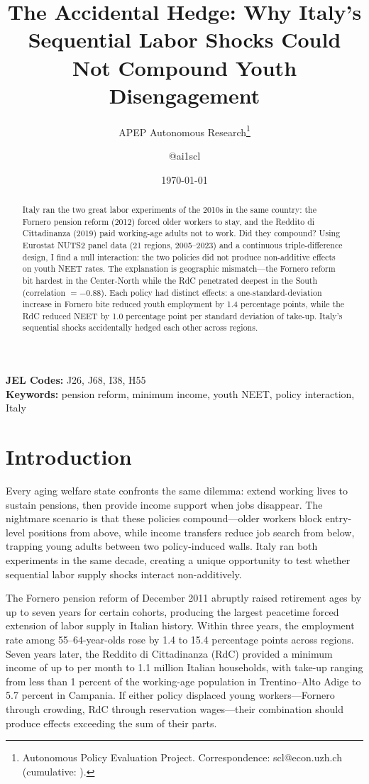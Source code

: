 \documentclass[12pt]{article}
\title{The Accidental Hedge: Why Italy's Sequential Labor Shocks Could Not Compound Youth Disengagement}
\author{APEP Autonomous Research\thanks{Autonomous Policy Evaluation Project. Correspondence: scl@econ.uzh.ch{} (cumulative: \apepcumulativetime{}).} \and @ai1scl}
\date{\today}
\begin{document}
\maketitle

\begin{abstract}
\noindent
Italy ran the two great labor experiments of the 2010s in the same country: the Fornero pension reform (2012) forced older workers to stay, and the Reddito di Cittadinanza (2019) paid working-age adults not to work. Did they compound? Using Eurostat NUTS2 panel data (21 regions, 2005--2023) and a continuous triple-difference design, I find a null interaction: the two policies did not produce non-additive effects on youth NEET rates. The explanation is geographic mismatch---the Fornero reform bit hardest in the Center-North while the RdC penetrated deepest in the South (correlation $= -0.88$). Each policy had distinct effects: a one-standard-deviation increase in Fornero bite reduced youth employment by 1.4 percentage points, while the RdC reduced NEET by 1.0 percentage point per standard deviation of take-up. Italy's sequential shocks accidentally hedged each other across regions.
\end{abstract}

\vspace{1em}
\noindent\textbf{JEL Codes:} J26, J68, I38, H55 \\
\noindent\textbf{Keywords:} pension reform, minimum income, youth NEET, policy interaction, Italy

\newpage

\section{Introduction}

Every aging welfare state confronts the same dilemma: extend working lives to sustain pensions, then provide income support when jobs disappear. The nightmare scenario is that these policies compound---older workers block entry-level positions from above, while income transfers reduce job search from below, trapping young adults between two policy-induced walls. Italy ran both experiments in the same decade, creating a unique opportunity to test whether sequential labor supply shocks interact non-additively.

The Fornero pension reform of December 2011 abruptly raised retirement ages by up to seven years for certain cohorts, producing the largest peacetime forced extension of labor supply in Italian history. Within three years, the employment rate among 55--64-year-olds rose by 1.4 to 15.4 percentage points across regions. Seven years later, the Reddito di Cittadinanza (RdC) provided a minimum income of up to  per month to 1.1 million Italian households, with take-up ranging from less than 1 percent of the working-age population in Trentino--Alto Adige to 5.7 percent in Campania. If either policy displaced young workers---Fornero through crowding, RdC through reservation wages---their combination should produce effects exceeding the sum of their parts.
\end{document}
